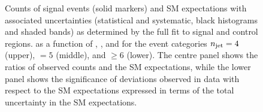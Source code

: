 \begin{figure}
\begin{center}
  \caption{Counts of signal events (solid markers) and SM expectations
    with associated uncertainties (statistical and systematic, black
    histograms and shaded bands) 
    as determined by the full fit to signal and control regions.
    as a function of \nb, \scalht, and \mht for the event categories
    $n_{\text{jet}} = 4$ (upper), $=5$ (middle), and ${\geq}6$ (lower).
    The centre panel shows the ratios of
    observed counts and the SM expectations, while the lower panel
    shows the significance of deviations observed in data with respect
    to the SM expectations expressed in terms of the total uncertainty
    in the SM expectations.
    }
        \label{fig:T1qqqqLL_full-fit_456}
    \end{center}
\end{figure}

